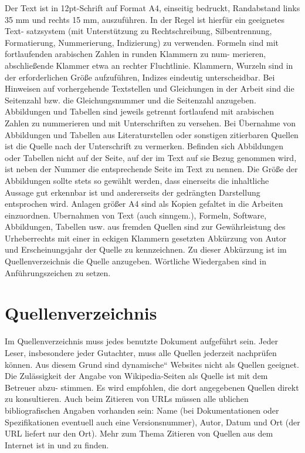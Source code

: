 Der Text ist in 12pt-Schrift auf Format A4, einseitig bedruckt, Randabstand links
35 mm und rechts 15 mm, auszuführen. In der Regel ist hierfür ein geeignetes Text-
satzsystem (mit Unterstützung zu Rechtschreibung, Silbentrennung, Formatierung,
Nummerierung, Indizierung) zu verwenden.
Formeln sind mit fortlaufenden arabischen Zahlen in runden Klammern zu num-
merieren, abschließende Klammer etwa an rechter Fluchtlinie. Klammern, Wurzeln 
sind in der erforderlichen Größe aufzuführen, Indizes eindeutig unterscheidbar.
Bei Hinweisen auf vorhergehende Textstellen und Gleichungen in der Arbeit sind die
Seitenzahl bzw. die Gleichungsnummer und die Seitenzahl anzugeben.
Abbildungen und Tabellen sind jeweils getrennt fortlaufend mit arabischen Zahlen zu
nummerieren und mit Unterschriften zu versehen. Bei Übernahme von Abbildungen
und Tabellen aus Literaturstellen oder sonstigen zitierbaren Quellen ist die Quelle
nach der Unterschrift zu vermerken. Befinden sich Abbildungen oder Tabellen nicht
auf der Seite, auf der im Text auf sie Bezug genommen wird, ist neben der Nummer
die entsprechende Seite im Text zu nennen. Die Größe der Abbildungen sollte stets
so gewählt werden, dass einerseits die inhaltliche Aussage gut erkennbar ist und
andererseits der gedrängten Darstellung entsprochen wird.
Anlagen größer A4 sind als Kopien gefaltet in die Arbeiten einzuordnen.
Ubernahmen von Text (auch sinngem.), Formeln, Software, Abbildungen, Tabellen
usw. aus fremden Quellen sind zur Gewährleistung des Urheberrechts mit einer
in eckigen Klammern gesetzten Abkürzung von Autor und Erscheinungsjahr der
Quelle zu kennzeichnen. Zu dieser Abkürzung ist im Quellenverzeichnis die Quelle
anzugeben. Wörtliche Wiedergaben sind in Anführungszeichen zu setzen.


\section{Quellenverzeichnis}
\label{sec:quellenverz}

Im Quellenverzeichnis muss jedes benutzte Dokument aufgeführt sein. Jeder Leser, 
insbesondere jeder Gutachter, muss alle Quellen jederzeit nachprüfen können.
Aus diesem Grund sind dynamische“ Websites nicht als Quellen geeignet. Die
Zulässigkeit der Angabe von Wikipedia-Seiten als Quelle ist mit dem Betreuer abzu-
stimmen. Es wird empfohlen, die dort angegebenen Quellen direkt zu konsultieren.
Auch beim Zitieren von URLs müssen alle ublichen bibliografischen Angaben vorhanden 
sein: Name (bei Dokumentationen oder Spezifikationen eventuell auch eine
Versionsnummer), Autor, Datum und Ort (der URL liefert nur den Ort). Mehr zum
Thema Zitieren von Quellen aus dem Internet ist in \cite{RS02} und \cite{Tap96} zu finden.


